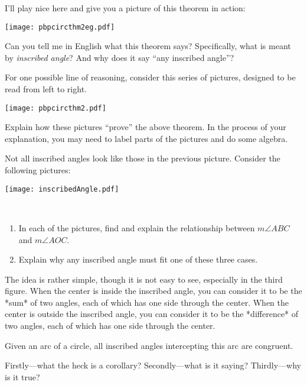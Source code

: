 \documentclass{ximera}
\begin{document}
I'll play nice here and give you a picture of this theorem in action:
\begin{image}
\texttt{[image: pbpcircthm2eg.pdf]}
\end{image}

\begin{problem}
Can you tell me in English what this theorem says?  Specifically, what is meant by
\textit{inscribed angle}?  And why does it say ``any inscribed angle''?
\end{problem}

\begin{problem} 
For one possible line of reasoning, consider this series of pictures, designed to be read from left to right.
\begin{image}
\texttt{[image: pbpcircthm2.pdf]}
\end{image}

Explain how these pictures ``prove'' the above theorem. In the process
of your explanation, you may need to label parts of the pictures and
do some algebra.
\end{problem}


\begin{problem}
Not all inscribed angles look like those in the previous picture.  Consider the following pictures:  
\begin{image}
\texttt{[image: inscribedAngle.pdf]}
\end{image}
\
\begin{enumerate}
\item In each of the pictures, find and explain the relationship between $m\angle ABC$ and $m\angle AOC$.
\item Explain why any inscribed angle must fit one of these three cases.  
\end{enumerate}
\end{problem}

\begin{teachingnote}
The idea is rather simple, though it is not easy to see, especially in the third figure.  When the center is inside the inscribed angle, you can consider it to be the *sum* of two angles, each of which has one side through the center.  When the center is outside the inscribed angle, you can consider it to be the *difference* of two angles, each of which has one side through the center.  
\end{teachingnote}

\begin{corollary} 
Given an arc of a circle, all inscribed angles intercepting this arc are congruent.
\end{corollary}

\begin{problem} 
Firstly---what the heck is a corollary? Secondly---what is it saying?
Thirdly---why is it true?
\end{problem}
\end{document}
